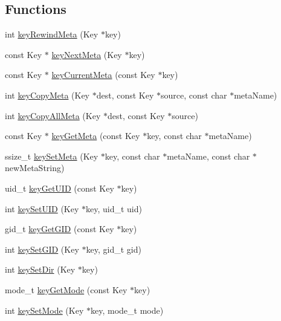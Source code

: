\subsection*{Functions}
\begin{DoxyCompactItemize}
\item 
int \hyperlink{group__keymeta_ga5dbb669802eea27e106ee3a5e39717a9}{key\-Rewind\-Meta} (Key $\ast$key)
\item 
const Key $\ast$ \hyperlink{group__keymeta_ga4c88342f580a4291455a801af71ce048}{key\-Next\-Meta} (Key $\ast$key)
\item 
const Key $\ast$ \hyperlink{group__keymeta_ga74a273f529030f4947df52e14fdd2869}{key\-Current\-Meta} (const Key $\ast$key)
\item 
int \hyperlink{group__keymeta_ga9a22b992478e613c8788bd460b4a1f0c}{key\-Copy\-Meta} (Key $\ast$dest, const Key $\ast$source, const char $\ast$meta\-Name)
\item 
int \hyperlink{group__keymeta_ga8e63720a65610a29597494d0671f9401}{key\-Copy\-All\-Meta} (Key $\ast$dest, const Key $\ast$source)
\item 
const Key $\ast$ \hyperlink{group__keymeta_ga9ed3875495ddb3d8a8d29158a60a147c}{key\-Get\-Meta} (const Key $\ast$key, const char $\ast$meta\-Name)
\item 
ssize\-\_\-t \hyperlink{group__keymeta_gae1f15546b234ffb6007d8a31178652b9}{key\-Set\-Meta} (Key $\ast$key, const char $\ast$meta\-Name, const char $\ast$new\-Meta\-String)
\item 
uid\-\_\-t \hyperlink{group__keymeta_gacaa5060e67b03f50ae49a3620c54bc46}{key\-Get\-U\-I\-D} (const Key $\ast$key)
\item 
int \hyperlink{group__keymeta_gab5f284f5ecd261e0a290095f50ba1af7}{key\-Set\-U\-I\-D} (Key $\ast$key, uid\-\_\-t uid)
\item 
gid\-\_\-t \hyperlink{group__keymeta_ga46a95e81d7d7f4e3eb59e60e5f3738c0}{key\-Get\-G\-I\-D} (const Key $\ast$key)
\item 
int \hyperlink{group__keymeta_ga9e3d0fb3f7ba906e067727b9155d22e3}{key\-Set\-G\-I\-D} (Key $\ast$key, gid\-\_\-t gid)
\item 
int \hyperlink{group__keymeta_gaae575bd86a628a15ee45baa860522e75}{key\-Set\-Dir} (Key $\ast$key)
\item 
mode\-\_\-t \hyperlink{group__keymeta_gabc0cec592ce3b77e9bc33dbc8e8f6bdc}{key\-Get\-Mode} (const Key $\ast$key)
\item 
int \hyperlink{group__keymeta_ga8803037e35b9da1ce492323a88ff6bc3}{key\-Set\-Mode} (Key $\ast$key, mode\-\_\-t mode)

\end{DoxyCompactItemize}
